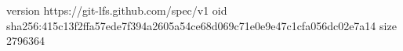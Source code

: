 version https://git-lfs.github.com/spec/v1
oid sha256:415c13f2ffa57ede7f394a2605a54ce68d069c71e0e9e47c1cfa056dc02e7a14
size 2796364
